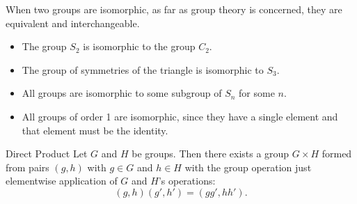 \documentclass[fleqn]{NotesClass}
\newcommand{\cyclicGroupC}[1][n]{C_{#1}}
\newcommand{\symmetricGroup}[1][n]{S_{#1}}
\begin{document}
    When two groups are isomorphic, as far as group theory is concerned, they are equivalent and interchangeable.
    
    \begin{exm}{}{}
        \begin{itemize}
            \item The group \(\symmetricGroup[2]\) is isomorphic to the group \(\cyclicGroupC[2]\).
            \item The group of symmetries of the triangle is isomorphic to \(\symmetricGroup[3]\).
            \item All groups are isomorphic to some subgroup of \(\symmetricGroup[n]\) for some \(n\).
            \item All groups of order 1 are isomorphic, since they have a single element and that element must be the identity.
        \end{itemize}
    \end{exm}
    
    \begin{dfn}{Direct Product}{}
        Let \(G\) and \(H\) be groups.
        Then there exists a group \(G \times H\) formed from pairs \((g, h)\) with \(g \in G\) and \(h \in H\) with the group operation just elementwise application of \(G\) and \(H\)'s operations:
        \begin{equation}
            (g, h)(g', h') = (gg', hh').
        \end{equation}
    \end{dfn}
    
\end{document}
